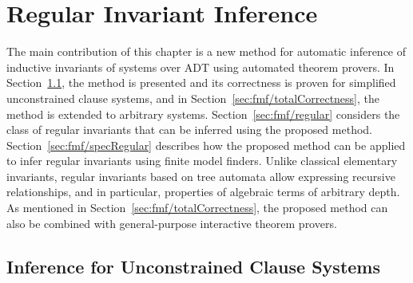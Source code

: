 \chapter{Regular Invariant Inference}\label{ch:fmf}

The main contribution of this chapter is a new method for automatic inference of inductive invariants of systems over ADT using automated theorem provers.
In Section~\cref{sec:fmf/partialCorrectness}, the method is presented and its correctness is proven for simplified unconstrained clause systems, and in Section~\cref{sec:fmf/totalCorrectness}, the method is extended to arbitrary systems.
Section~\cref{sec:fmf/regular} considers the class of regular invariants that can be inferred using the proposed method.
Section~\cref{sec:fmf/specRegular} describes how the proposed method can be applied to infer regular invariants using finite model finders.
Unlike classical elementary invariants, regular invariants based on tree automata allow expressing recursive relationships, and in particular, properties of algebraic terms of arbitrary depth.
As mentioned in Section~\cref{sec:fmf/totalCorrectness}, the proposed method can also be combined with general-purpose interactive theorem provers.

\section{Inference for Unconstrained Clause Systems}\label{sec:fmf/partialCorrectness}

